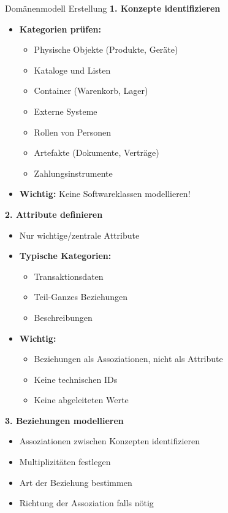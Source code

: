 \begin{KR}{Domänenmodell Erstellung}
\textbf{1. Konzepte identifizieren}
\begin{itemize}
    \item \textbf{Kategorien prüfen:}
    \begin{itemize}
        \item Physische Objekte (Produkte, Geräte)
        \item Kataloge und Listen
        \item Container (Warenkorb, Lager)
        \item Externe Systeme
        \item Rollen von Personen
        \item Artefakte (Dokumente, Verträge)
        \item Zahlungsinstrumente
    \end{itemize}
    \item \textbf{Wichtig:} Keine Softwareklassen modellieren!
\end{itemize}

\textbf{2. Attribute definieren}
\begin{itemize}
    \item Nur wichtige/zentrale Attribute
    \item \textbf{Typische Kategorien:}
    \begin{itemize}
        \item Transaktionsdaten
        \item Teil-Ganzes Beziehungen
        \item Beschreibungen
    \end{itemize}
    \item \textbf{Wichtig:}
    \begin{itemize}
        \item Beziehungen als Assoziationen, nicht als Attribute
        \item Keine technischen IDs
        \item Keine abgeleiteten Werte
    \end{itemize}
\end{itemize}

\textbf{3. Beziehungen modellieren}
\begin{itemize}
    \item Assoziationen zwischen Konzepten identifizieren
    \item Multiplizitäten festlegen
    \item Art der Beziehung bestimmen
    \item Richtung der Assoziation falls nötig
\end{itemize}
\end{KR}

